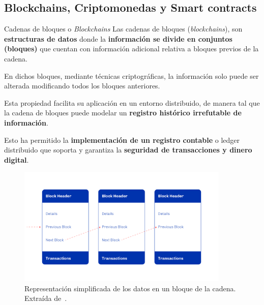 \documentclass{beamer}
\begin{document}
\subsection{Blockchains, Criptomonedas y Smart contracts}

\begin{frame}{Cadenas de bloques o \textit{Blockchains}}
Las cadenas de bloques (\textit{blockchains}), son \textbf{estructuras de datos} donde la \textbf{información se divide en conjuntos (bloques)} que cuentan con información adicional relativa a bloques previos de la cadena.
\smallskip

\pause
\vfill

En dichos bloques, mediante técnicas criptográficas, la información solo puede ser alterada modificando todos los bloques anteriores.
\smallskip

\pause
\vfill

Esta propiedad facilita su aplicación en un entorno distribuido, de manera tal que la cadena de bloques puede modelar un \textbf{registro histórico irrefutable de información}.
\smallskip

\pause
\vfill

Esto ha permitido la \textbf{implementación de un registro contable} o ledger distribuido que soporta y garantiza la \textbf{seguridad de transacciones y dinero digital}. 

\end{frame}


\begin{frame}

\begin{figure}
    \centering
    \includegraphics[width=0.9\textwidth]{Bloques.png}
    \caption[Representación simplificada de los datos en un bloque de la cadena.]{Representación simplificada de los datos en un bloque de la cadena. Extraída de~\cite{plutus-smart-contracts}.}\label{fig:Bloques}
\end{figure}


\end{frame}
\end{document}
